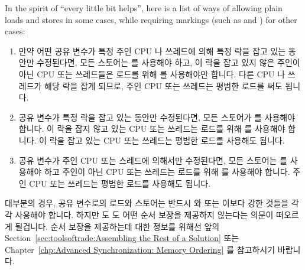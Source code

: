 {{{{In the spirit of ``every little bit helps'', here is a list of
ways of allowing plain loads and stores in some cases, while requiring
markings (such as  and ) for other
cases:
\fi

\begin{enumerate}
\item	만약 어떤 공유 변수가 특정 주인 CPU 나 쓰레드에 의해 특정 락을 잡고
	있는 동안만 수정된다면, 모든 스토어는  를 사용해야
	하고, 이 락을 잡고 있지 않은 주인이 아닌 CPU 또는 쓰레드들은 로드를
	위해  를 사용해야만 합니다.
	다른 CPU 나 쓰레드가 해당 락을 잡게 되므로, 주인 CPU 또는 쓰레드는
	평범한 로드를 써도 됩니다.
\item	공유 변수가 특정 락을 잡고 있는 동안만 수정된다면, 모든 스토어가
	 를 사용해야 합니다.
	이 락을 잡지 않고 있는 CPU 또는 쓰레드는 로드를 위해 
	를 사용해야 합니다.
	이 락을 잡고 있는 CPU 또는 쓰레드는 평범한 로드를 사용해도 됩니다.

\item	공유 변수가 주인 CPU 또는 스레드에 의해서만 수정된다면, 모든 스토어는
	 를 사용해야 하고 주인이 아닌 CPU 또는 쓰레드는 로드를
	위해  를 사용해야 합니다.
	주인 CPU 또는 쓰레드는 평범한 로드를 사용해도 됩니다.

\end{enumerate}

대부분의 경우, 공유 변수로의 로드와 스토어는 반드시  와
 또는 이보다 강한 것들을 각각 사용해야 합니다.
하지만  도  도 어떤 순서 보장을 제공하지
않는다는 의문이 떠오르게 될겁니다.
순서 보장을 제공하는데 대한 정보를 위해선
앞의 Section~\ref{sec:toolsoftrade:Assembling the Rest of a Solution} 또는
Chapter~\ref{chp:Advanced Synchronization: Memory Ordering}
를 참고하시기 바랍니다.
\iffalse

}}}}
